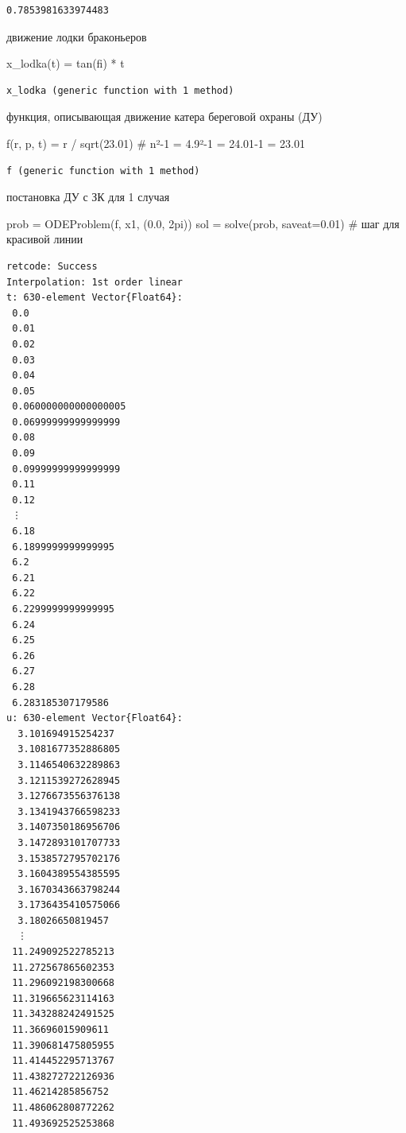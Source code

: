 \documentclass[
  12pt,
  a4paper,
  DIV=11,
  numbers=noendperiod]{scrreprt}
\newenvironment{Shaded}{\begin{snugshade}}{\end{snugshade}}
\newcommand{\CommentTok}[1]{\textcolor[rgb]{0.37,0.37,0.37}{#1}}
\newcommand{\FloatTok}[1]{\textcolor[rgb]{0.68,0.00,0.00}{#1}}
\newcommand{\FunctionTok}[1]{\textcolor[rgb]{0.28,0.35,0.67}{#1}}
\newcommand{\NormalTok}[1]{\textcolor[rgb]{0.00,0.23,0.31}{#1}}
\newcommand{\OperatorTok}[1]{\textcolor[rgb]{0.37,0.37,0.37}{#1}}
\begin{document}
\begin{verbatim}
0.7853981633974483
\end{verbatim}

движение лодки браконьеров

\begin{Shaded}
\begin{Highlighting}[]
\FunctionTok{x\_lodka}\NormalTok{(t) }\OperatorTok{=} \FunctionTok{tan}\NormalTok{(fi) }\OperatorTok{*}\NormalTok{ t}
\end{Highlighting}
\end{Shaded}

\begin{verbatim}
x_lodka (generic function with 1 method)
\end{verbatim}

функция, описывающая движение катера береговой охраны (ДУ)

\begin{Shaded}
\begin{Highlighting}[]
\FunctionTok{f}\NormalTok{(r, p, t) }\OperatorTok{=}\NormalTok{ r }\OperatorTok{/} \FunctionTok{sqrt}\NormalTok{(}\FloatTok{23.01}\NormalTok{)   }\CommentTok{\# n²{-}1 = 4.9²{-}1 = 24.01{-}1 = 23.01}
\end{Highlighting}
\end{Shaded}

\begin{verbatim}
f (generic function with 1 method)
\end{verbatim}

постановка ДУ с ЗК для 1 случая

\begin{Shaded}
\begin{Highlighting}[]
\NormalTok{prob }\OperatorTok{=} \FunctionTok{ODEProblem}\NormalTok{(f, x1, (}\FloatTok{0.0}\NormalTok{, }\FloatTok{2}\NormalTok{pi))}
\NormalTok{sol }\OperatorTok{=} \FunctionTok{solve}\NormalTok{(prob, saveat}\OperatorTok{=}\FloatTok{0.01}\NormalTok{)  }\CommentTok{\# шаг для красивой линии}
\end{Highlighting}
\end{Shaded}

\begin{verbatim}
retcode: Success
Interpolation: 1st order linear
t: 630-element Vector{Float64}:
 0.0
 0.01
 0.02
 0.03
 0.04
 0.05
 0.060000000000000005
 0.06999999999999999
 0.08
 0.09
 0.09999999999999999
 0.11
 0.12
 ⋮
 6.18
 6.1899999999999995
 6.2
 6.21
 6.22
 6.2299999999999995
 6.24
 6.25
 6.26
 6.27
 6.28
 6.283185307179586
u: 630-element Vector{Float64}:
  3.101694915254237
  3.1081677352886805
  3.1146540632289863
  3.1211539272628945
  3.1276673556376138
  3.1341943766598233
  3.1407350186956706
  3.1472893101707733
  3.1538572795702176
  3.1604389554385595
  3.1670343663798244
  3.1736435410575066
  3.18026650819457
  ⋮
 11.249092522785213
 11.272567865602353
 11.296092198300668
 11.319665623114163
 11.343288242491525
 11.36696015909611
 11.390681475805955
 11.414452295713767
 11.438272722126936
 11.46214285856752
 11.486062808772262
 11.493692525253868
\end{verbatim}
\end{document}
